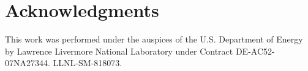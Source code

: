 \documentclass[11pt]{article}
\begin{document}
\section*{Acknowledgments}
This work was performed under the auspices of the U.S. Department of Energy by Lawrence
Livermore National Laboratory under Contract DE-AC52-07NA27344. LLNL-SM-818073. 







\appendix
\end{document}
